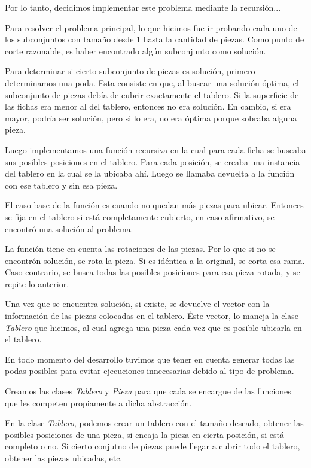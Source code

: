 \quad Por lo tanto, decidimos implementar este problema mediante la recursi\'on...

\quad
 
\quad

\quad Para resolver el problema principal, lo que hicimos fue ir probando cada uno de los subconjuntos con tama\~no desde 1 hasta la cantidad de piezas. Como punto de corte razonable, es haber encontrado alg\'un subconjunto como soluci\'on.

\quad Para determinar si cierto subconjunto de piezas es soluci\'on, primero determinamos una poda. Esta consiste en que, al buscar una soluci\'on \'optima, el subconjunto de piezas deb\'ia de cubrir exactamente el tablero. Si la superficie de las fichas era menor al del tablero, entonces no era soluci\'on. En cambio, si era mayor, podr\'ia ser soluci\'on, pero si lo era, no era \'optima porque sobraba alguna pieza. 

\quad Luego implementamos una funci\'on recursiva en la cual para cada ficha se buscaba sus posibles posiciones en el tablero. Para cada posici\'on, se creaba una instancia del tablero en la cual se la ubicaba ah\'i. Luego se llamaba devuelta a la funci\'on con ese tablero y sin esa pieza.

\quad El caso base de la funci\'on es cuando no quedan m\'as piezas para ubicar. Entonces se fija en el tablero si est\'a completamente cubierto, en caso afirmativo, se encontr\'o una soluci\'on al problema.

\quad La funci\'on tiene en cuenta las rotaciones de las piezas. Por lo que si no se encontr\'on soluci\'on, se rota la pieza. Si es id\'entica a la original, se corta esa rama. Caso contrario, se busca todas las posibles posiciones para esa pieza rotada, y se repite lo anterior.

\quad Una vez que se encuentra soluci\'on, si existe, se devuelve el vector con la informaci\'on de las piezas colocadas en el tablero. \'Este vector, lo maneja la clase \textit{Tablero} que hicimos, al cual agrega una pieza cada vez que es posible ubicarla en el tablero.

\quad En todo momento del desarrollo tuvimos que tener en cuenta generar todas las podas posibles para evitar ejecuciones innecesarias debido al tipo de problema.

\quad Creamos las clases \textit{Tablero} y \textit{Pieza} para que cada se encargue de las funciones que les competen propiamente a dicha abstracci\'on. 

\quad En la clase \textit{Tablero}, podemos crear un tablero con el tama\~no deseado, obtener las posibles posiciones de una pieza, si encaja la pieza en cierta posici\'on, si est\'a completo o no. Si cierto conjutno de piezas puede llegar a cubrir todo el tablero, obtener las piezas ubicadas, etc.

